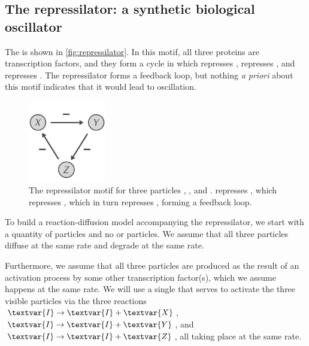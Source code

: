 \FloatBarrier
{}
\subsection{The repressilator: a synthetic biological oscillator}

The  is shown in \autoref{fig:repressilator}. In this motif, all three proteins are transcription factors, and they form a cycle in which  represses ,  represses , and  represses . The repressilator forms a feedback loop, but nothing \textit{a priori} about this motif indicates that it would lead to oscillation.\\

\begin{figure}[h]
\centering
\mySfFamily
\includegraphics[width = 0.3\textwidth]{../images/repressilator.png}
\caption{The repressilator motif for three particles , , and .  represses , which represses , which in turn represses , forming a feedback loop.}
\label{fig:repressilator}
\end{figure}

\begin{qbox}\end{qbox}

To build a reaction-diffusion model accompanying the repressilator, we start with a quantity of  particles and no  or  particles. We assume that all three particles diffuse at the same rate and degrade at the same rate.

Furthermore, we assume that all three particles are produced as the result of an activation process by some other transcription factor(s), which we assume happens at the same rate. We will use a single   that serves to activate the three visible particles via the three reactions $\textvar{I} \rightarrow \textvar{I} + \textvar{X}$, $\textvar{I} \rightarrow \textvar{I} + \textvar{Y}$, and $\textvar{I} \rightarrow \textvar{I} + \textvar{Z}$, all taking place at the same rate.

